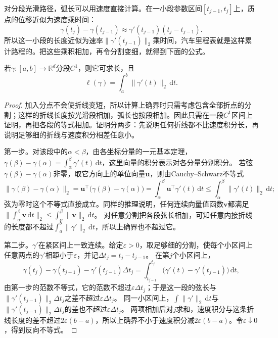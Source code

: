 对分段光滑路径，弧长可以用速度直接计算。在一小段参数区间$[t_{j-1},t_j]$上，质点的位移近似为速度乘时间：
\[
 \gamma(t_j)-\gamma(t_{j-1})\approx\gamma'(t_{j-1})(t_j-t_{j-1}).
\]
所以这一小段的长度近似为速率$\lVert\gamma'(t_{j-1})\rVert_2$乘时间，汽车里程表就是这样累计路程的。把这些乘积相加，再令分割变细，就得到下面的公式。
\begin{theorem}[分段光滑路径的弧长]
若$\gamma:[a,b]\to\mathbb R^d$分段$C^1$，则它可求长，且
\[
 \ell(\gamma)=\int_a^b\lVert\gamma'(t)\rVert_2\,\mathrm dt.
\]
\end{theorem}
\begin{proof}
加入分点不会使折线变短，所以计算上确界时只需考虑包含全部折点的分割；这样的折线长度按光滑段相加，弧长也按段相加。因此只需在一段$C^1$区间上证明，再把各段的等式相加。证明分两步：先说明任何折线都不比速度积分长，再说明足够细的折线与速度积分相差任意小。

第一步。对该段中的$\alpha<\beta$，由各坐标分量的一元基本定理，
$\gamma(\beta)-\gamma(\alpha)=\int_\alpha^\beta\gamma'(t)\,\mathrm dt$，这里向量的积分表示对各分量分别积分。
若弦$\gamma(\beta)-\gamma(\alpha)$非零，取它方向上的单位向量$\bm u$，则由Cauchy--Schwarz不等式
\[
 \lVert\gamma(\beta)-\gamma(\alpha)\rVert_2
 =\bm u^\top\bigl(\gamma(\beta)-\gamma(\alpha)\bigr)
 =\int_\alpha^\beta\bm u^\top\gamma'(t)\,\mathrm dt
 \leq\int_\alpha^\beta\lVert\gamma'(t)\rVert_2\,\mathrm dt;
\]
弦为零时这个不等式直接成立。同样的推理说明，任何连续向量值函数$\bm v$都满足$\lVert\int_\alpha^\beta\bm v\,\mathrm dt\rVert_2\leq\int_\alpha^\beta\lVert\bm v\rVert_2\,\mathrm dt$。
对任意分割把各段弦长相加，可知任意内接折线的长度都不超过$\int_a^b\lVert\gamma'\rVert_2\,\mathrm dt$，所以上确界也不超过它。

第二步。$\gamma'$在紧区间上一致连续。给定$\varepsilon>0$，取足够细的分割，使每个小区间上任意两点的$\gamma'$相距小于$\varepsilon$，并记$\Delta t_j=t_j-t_{j-1}$。
在第$j$个小区间上，
\[
 \gamma(t_j)-\gamma(t_{j-1})-\gamma'(t_{j-1})\Delta t_j
 =\int_{t_{j-1}}^{t_j}\bigl(\gamma'(t)-\gamma'(t_{j-1})\bigr)\,\mathrm dt,
\]
由第一步的范数不等式，它的范数不超过$\varepsilon\Delta t_j$；于是这一段的弦长与$\lVert\gamma'(t_{j-1})\rVert_2\Delta t_j$之差不超过$\varepsilon\Delta t_j$。
同一小区间上，$\int\lVert\gamma'\rVert_2\,\mathrm dt$与$\lVert\gamma'(t_{j-1})\rVert_2\Delta t_j$的差也不超过$\varepsilon\Delta t_j$。
两项相加后对$j$求和，速度积分与这条折线长度的差不超过$2\varepsilon(b-a)$，所以上确界不小于速度积分减$2\varepsilon(b-a)$。令$\varepsilon\downarrow0$，得到反向不等式。
\end{proof}

